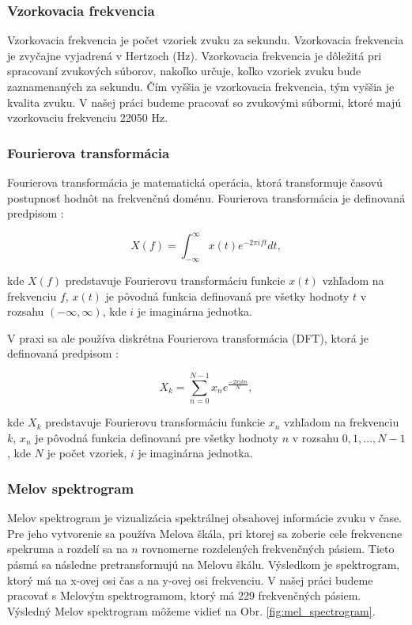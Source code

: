 \subsubsection{Vzorkovacia frekvencia}

Vzorkovacia frekvencia je počet vzoriek zvuku za sekundu. Vzorkovacia frekvencia je zvyčajne vyjadrená v Hertzoch (Hz). Vzorkovacia frekvencia je dôležitá pri spracovaní zvukových súborov, nakoľko určuje, koľko vzoriek zvuku bude zaznamenaných za sekundu. Čím vyššia je vzorkovacia frekvencia, tým vyššia je kvalita zvuku. V našej práci budeme pracovať so zvukovými súbormi, ktoré majú vzorkovaciu frekvenciu 22050 Hz.

\subsubsection{Fourierova transformácia}

Fourierova transformácia je matematická operácia, ktorá transformuje časovú postupnosť hodnôt na frekvenčnú doménu. Fourierova transformácia je definovaná predpisom \cite{davis2001fourier}:

\begin{equation}
  X(f) = \int_{-\infty}^{\infty} x(t) e^{-2\pi ift} dt,
\end{equation}

\noindent kde $X(f)$ predstavuje Fourierovu transformáciu funkcie $x(t)$ vzhľadom na frekvenciu $f$, $x(t)$ je pôvodná funkcia definovaná pre všetky hodnoty $t$ v rozsahu $(-\infty, \infty)$, kde $i$ je imaginárna jednotka.

V praxi sa ale používa diskrétna Fourierova transformácia (DFT), ktorá je definovaná predpisom \cite{davis2001fourier}:

\begin{equation}
  X_k = \sum_{n=0}^{N-1} x_n e^{\frac{-2\pi ikn}{N}},
\end{equation}

\noindent kde $X_k$ predstavuje Fourierovu transformáciu funkcie $x_n$ vzhľadom na frekvenciu $k$, $x_n$ je pôvodná funkcia definovaná pre všetky hodnoty $n$ v rozsahu $0, 1, ..., N-1$, kde $N$ je počet vzoriek, $i$ je imaginárna jednotka.

\subsubsection{Melov spektrogram}

Melov spektrogram je vizualizácia spektrálnej obsahovej informácie zvuku v čase. Pre jeho vytvorenie sa používa Melova škála, pri ktorej sa zoberie cele frekvencne spekruma a rozdelí sa na $n$ rovnomerne rozdelených frekvenčných pásiem. Tieto pásmá sa následne pretransformujú na Melovu škálu. Výsledkom je spektrogram, ktorý má na x-ovej osi čas a na y-ovej osi frekvenciu. V našej práci budeme pracovať s Melovým spektrogramom, ktorý má 229 frekvenčných pásiem. Výsledný Melov spektrogram môžeme vidieť na Obr. \ref{fig:mel_spectrogram}.

